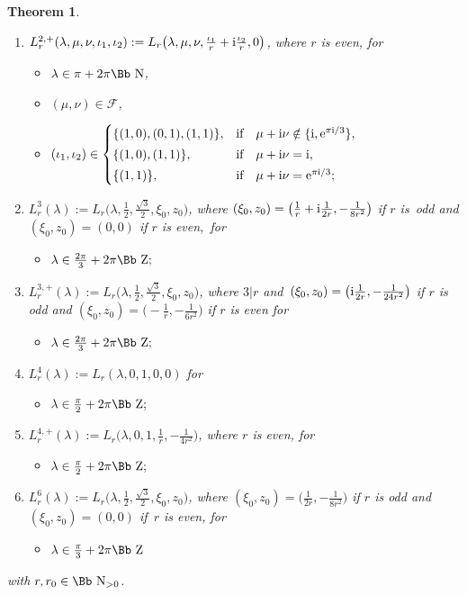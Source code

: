 \documentclass[pdftex]{sigma}
\newcommand\NN{{\mbox{\Bb N}}}
\newcommand\ZZ{{\mbox{\Bb Z}}}
\newcommand\cF{{\mathcal F}}
\numberwithin{equation}{section}
\newtheorem{Theorem}{Theorem}[section]
\begin{document}
\begin{Theorem}
\begin{enumerate}
\begin{itemize}
\item[$\circ$] $(\mu,\nu)\in\cF;$
\end{itemize}
%
\item[$3.$] $L^{2,+}_r(\lambda,\mu,\nu,\iota_1,\iota_2):= L_r\big(\lambda,\mu,\nu,\frac{\iota_1}{r}+{\rm i}\frac{\iota_2}{r},0\big)$, where $r$ is even, for
\begin{itemize}
\item[$\circ$] $\lambda\in\pi+2\pi\NN$,
\item[$\circ$] $(\mu,\nu)\in\cF$,
\item[$\circ$]
$(\iota_1,\iota_2)\in \begin{cases}	
\{(1,0),(0,1),(1,1)\}, &\text{if}\quad
\mu+{\rm i}\nu\notin\{{\rm i},{\rm e}^{\pi {\rm i}/3}\}, \\[0.5ex]
\{(1,0),(1,1)\}, &\text{if}\quad \mu+{\rm i}\nu={\rm i},\\[0.5ex]
\{(1,1)\} ,&\text{if}\quad \mu+{\rm i}\nu={\rm e}^{\pi {\rm i}/3};
\end{cases}$
\end{itemize}
%
\item[$4.$] $L^3_r(\lambda):=L_r\big(\lambda,\frac{1}{2},\frac{\sqrt{3}}{2},\xi_0,z_0\big)$, where $(\xi_0,z_0)=\big(\frac1r+{\rm i}\frac1{2r},-\frac{1}{8r^2}\big)$ if $r$ is~odd and $(\xi_0,z_0)=(0,0)$ if $r$ is even,~for
\begin{itemize}
\item[$\circ$]
$\lambda \in \frac {2\pi}3 +2\pi \ZZ;$
\end{itemize}
%
\item[$5.$] $L^{3,+}_r(\lambda):=L_r\big(\lambda,\frac{1}{2},\frac{\sqrt{3}}{2},\xi_0,z_0\big)$, where $3|r$ and~$(\xi_0,z_0)=\big({\rm i}\frac1{2r},-\frac{1}{24r^2}\big)$ if $r$ is odd
and $(\xi_0,z_0)=\big({-}\frac1r,-\frac{1}{6r^2}\big)$ if $r$ is even for
\begin{itemize}
\item[$\circ$]
$\lambda \in \frac {2\pi}3 +2\pi \ZZ;$
\end{itemize}
%
\item[$6.$] $L^4_r(\lambda):= L_r(\lambda,0,1,0,0)$ for
\begin{itemize}
\item[$\circ$] $\lambda \in \frac \pi2 +2\pi \ZZ;$
\end{itemize}
%
\item[$7.$] $L^{4,+}_r(\lambda):=L_r\big(\lambda,0,1,\frac1r,-\frac1{4r^2}\big)$, where $r$ is even, for
\begin{itemize}
\item[$\circ$]
$\lambda \in \frac \pi2 +2\pi \ZZ;$
\end{itemize}
%
\item[$8.$] $L^6_r(\lambda):=L_r\big(\lambda,\frac{1}{2},\frac{\sqrt{3}}{2},\xi_0,z_0\big)$, where $(\xi_0,z_0)=\big(\frac{1}{2r}, -\frac{1}{8r^2}\big)$ if $r$ is odd and $(\xi_0,z_0)=(0,0)$ if~$r$ is even, for
\begin{itemize}
\item[$\circ$]
$\lambda \in \frac \pi3 +2\pi \ZZ$
\end{itemize}
\end{enumerate}
with $r, r_0\in\NN_{>0}$.


\end{Theorem}
\end{document}
